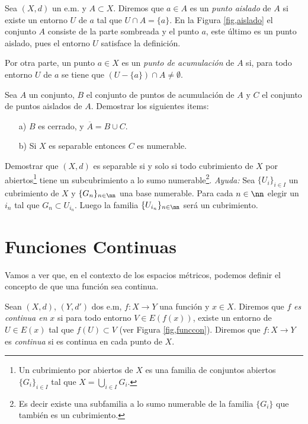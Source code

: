 \begin{ejercicio}{} Sea $(X,d)$ un e.m. y $A\subset X$. Diremos que
$a\in A$ es un \emph{punto aislado} de $A$ si existe un entorno
$U$ de $a$ tal que $U\cap A=\{a\}$. En la Figura
\vref{fig,aislado} el conjunto $A$ consiste de la parte sombreada
y el punto $a$, este último es un punto aislado, pues el entorno
$U$ satisface la definición.




Por otra parte, un punto $a\in X$ es un \emph{punto de
acumulación} de $A$ si, para todo entorno $U$ de $a$ se tiene
que $(U-\{a\})\cap A\neq\emptyset$.

Sea $A$ un conjunto, $B$ el conjunto de puntos de acumulación de
$A$ y $C$ el conjunto de puntos aislados de $A$. Demostrar los
siguientes items:
\begin{itemize}
    \item[a)] $B$ es cerrado, y $\overline{A}=B\cup C$.
    \item[b)] Si $X$ es separable entonces $C$ es numerable.
\end{itemize}
\end{ejercicio}
\begin{ejercicio}{} Demostrar que $(X,d)$ es separable si y solo si
 todo cubrimiento de $X$ por abiertos\footnote{Un cubrimiento por
abiertos de $X$ es una familia de conjuntos abiertos
$\{G_i\}_{i\in I}$ tal que $X=\bigcup_{i\in I}G_i$.} tiene un
subcubrimiento a lo sumo numerable\footnote{Es decir existe una
subfamilia a lo sumo numerable de la familia $\{G_i\}$ que
también es un cubrimiento.}. \emph{Ayuda:} Sea $\{U_i\}_{i\in
I}$ un cubrimiento de $X$ y $\{G_n\}_{n\in\nn}$ una base
numerable. Para cada $n\in\nn$ elegir un $i_n$ tal que $G_n\subset
U_{i_n}$. Luego la familia $\{U_{i_n}\}_{n\in\nn}$ será un
cubrimiento.
\end{ejercicio}



\section{Funciones Continuas}
Vamos a ver que, en el contexto de los espacios métricos,
podemos definir el concepto de que una función sea continua.

\begin{definicion}{} Sean $(X,d)$, $(Y,d')$ dos e.m, $f:X\rightarrow
Y$ una función y $x\in X$.
Diremos que $f$ \emph{es continua en}
$x$ si para todo entorno  $V\in E(f(x))$, existe un entorno de
$U\in E(x)$ tal que $f(U)\subset V$ (ver Figura
\vref{fig,funccon}). Diremos que $f:X\rightarrow Y$ es
\emph{continua} si es continua en cada punto de $X$.
\end{definicion}



